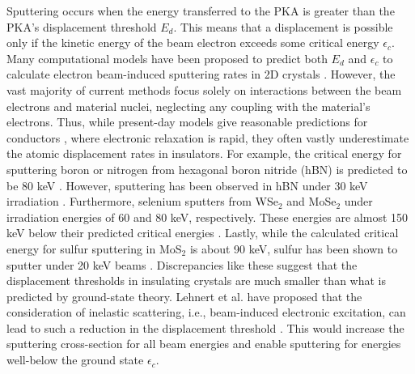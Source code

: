 \documentclass{article}
\begin{document}
Sputtering occurs when the energy transferred to the PKA is greater than
the PKA's displacement threshold $E_d$.
This means that a displacement is possible only if the kinetic energy of the
beam electron exceeds some critical energy $\epsilon_c$.
Many computational models have been proposed to predict both $E_d$ and
$\epsilon_c$ to calculate electron beam-induced sputtering rates in 2D crystals
\cite{Meyer2012, Susi2016, Yoshimura2018, Susi2019}.
However, the vast majority of current
methods focus solely on interactions between the beam electrons and material
nuclei, neglecting any coupling with the material’s electrons.
Thus, while present-day models give reasonable predictions for conductors
\cite{Meyer2012}, where electronic relaxation is rapid, they often vastly
underestimate the atomic displacement rates in insulators.
For example, the critical energy for sputtering boron or nitrogen from
hexagonal boron nitride (hBN) is predicted to be 80 keV \cite{Kotakoski2010}.
However, sputtering has been observed in hBN under 30 keV irradiation
\cite{Cretu2015}.
Furthermore, selenium sputters from WSe$_2$ and MoSe$_2$ under irradiation
energies of 60 and 80 keV, respectively.  These energies are almost 150 keV
below their predicted critical energies \cite{Lin2015, Lehnert2017}.
Lastly, while the calculated critical energy for sulfur sputtering in MoS$_2$
is about 90 keV, sulfur has been shown to sputter under 20 keV beams
\cite{Kretschmer2020}.
Discrepancies like these suggest that the displacement thresholds in insulating
crystals are much smaller than what is predicted by ground-state theory.
Lehnert et al.  have proposed that the consideration of inelastic scattering,
i.e., beam-induced electronic excitation, can lead to such a reduction in the
displacement threshold \cite{Lehnert2017}.
This would increase the sputtering cross-section for all beam energies and
enable sputtering for energies well-below the ground state $\epsilon_c$.
\end{document}
